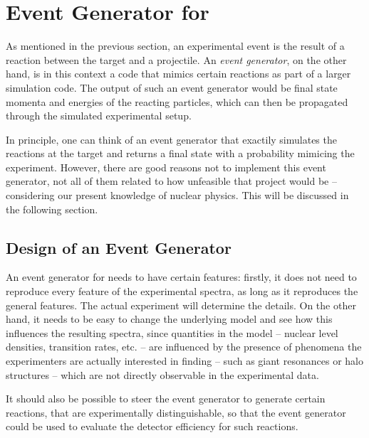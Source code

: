 \section{Event Generator for \rtb{}}
As mentioned in the previous section, an experimental event is the result of a reaction between the target and a projectile.
An \emph{event generator}, on the other hand, is in this context a code that mimics certain reactions as part of a larger simulation code. The output of such an event generator would be final state momenta and energies of the reacting particles, which can then be propagated through the simulated experimental setup. %

In principle, one can think of an event generator that exactily simulates the reactions at the target and returns a final state with a probability mimicing the experiment. However, there are good reasons not to implement this event generator, not all of them related to how unfeasible that project would be -- considering our present knowledge of nuclear physics. This will be discussed in the following section.


\subsection{Design of an Event Generator}
An event generator for \rtb{} needs to have certain features:
firstly, it does not need to reproduce every feature of the experimental spectra, as long as it reproduces the general features. The actual experiment will determine the details.
On the other hand, it needs to be easy to change the underlying model and see how this influences the resulting spectra, since quantities in the model -- nuclear level densities, transition rates, etc. -- are influenced by the presence of phenomena the experimenters are actually interested in finding -- such as giant resonances or halo structures -- which are not directly observable in the experimental data.
 
It should also be possible to steer the event generator to generate certain reactions, that are experimentally distinguishable, so that the event generator could be used to evaluate the detector efficiency for such reactions.


